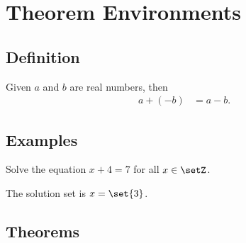 \chapter{Theorem Environments}

\section{Definition}

\begin{definition}
\label{0000}
Given \( a \) and \( b \) are real numbers, then
\cite{Olson2021}
\begin{align*}
    a + (-b) &= a - b.
\end{align*}
\end{definition}

\section{Examples}

\begin{example}
\label{0001}
Solve the equation \( x + 4 = 7 \) for all \( x \in \setZ \).
\end{example}
\begin{solution}
The solution set is \( x = \set{3} \).
\end{solution}

\section{Theorems}

